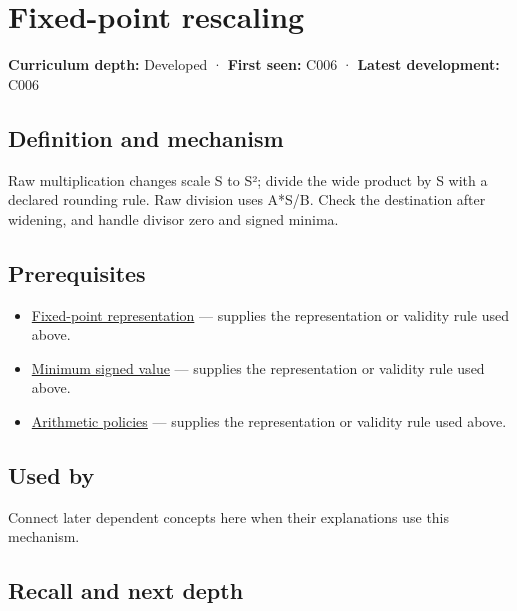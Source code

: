 \hypertarget{appendix-3333db47830f}{}
\section{Fixed-point rescaling}\label{appendix-3333db47830f-fixed-point-rescaling}

\textbf{Curriculum depth:} Developed · \textbf{First seen:} C006 · \textbf{Latest development:} C006

\subsection{Definition and mechanism}\label{appendix-3333db47830f-definition-and-mechanism}

Raw multiplication changes scale S to S²; divide the wide product by S with a declared rounding rule. Raw division uses A*S/B. Check the destination after widening, and handle divisor zero and signed minima.

\subsection{Prerequisites}\label{appendix-3333db47830f-prerequisites}

\begin{itemize}
\tightlist
\item
  \hyperref[appendix-1d0dbe8924cc]{Fixed-point representation} --- supplies the representation or validity rule used above.
\item
  \hyperref[appendix-05f39b10364d]{Minimum signed value} --- supplies the representation or validity rule used above.
\item
  \hyperref[appendix-2ed044358b82]{Arithmetic policies} --- supplies the representation or validity rule used above.
\end{itemize}

\subsection{Used by}\label{appendix-3333db47830f-used-by}

Connect later dependent concepts here when their explanations use this mechanism.

\subsection{Recall and next depth}\label{appendix-3333db47830f-recall-and-next-depth}

